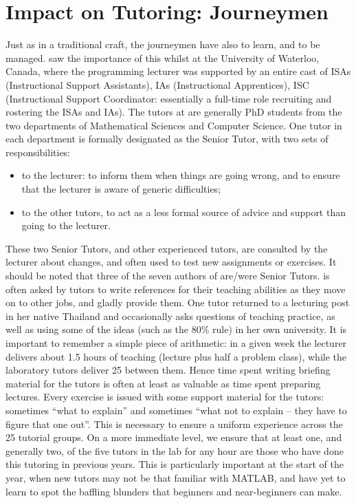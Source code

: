 \documentclass[conference,compsoc]{IEEEtran}
\begin{document}
\section{Impact on Tutoring: Journeymen}
Just as in a traditional craft, the journeymen have also to learn, and
to be managed. \JHD{} saw the importance of this whilst at the
University of Waterloo, Canada, where the programming lecturer was supported by an entire cast of ISAs (Instructional Support Assistants), IAs (Instructional Apprentices), ISC (Instructional Support Coordinator: essentially a full-time role recruiting and rostering the ISAs and IAs).
The tutors at \Bath{} are generally PhD students from the two departments of Mathematical Sciences and Computer Science. One tutor in each department is formally designated as the Senior Tutor, with two sets of responsibilities:
\begin{itemize}
\item	to the lecturer: to inform them when things are going wrong, and to ensure that the lecturer is aware of generic difficulties;
\item to the other tutors, to act as a less formal source of advice and support than going to the lecturer.
\end{itemize}
These two Senior Tutors, and other experienced tutors, are consulted by the lecturer about changes, and often used to test new assignments or exercises. It should be noted that three of the seven authors of \cite{XX} are/were Senior Tutors. \JHD{} is often asked by tutors to write references for their teaching abilities as they move on to other jobs, and gladly provide them. One tutor returned to a lecturing post in her native Thailand and occasionally asks \JHD{} questions of teaching practice, as well as using some of the ideas (such as the 80\% rule) in her own university.
It is important to remember a simple piece of arithmetic: in a given week the lecturer delivers about 1.5 hours of teaching (lecture plus half a problem class), while the laboratory tutors deliver 25 between them. Hence time spent writing briefing material for the tutors is often at least as valuable as time spent preparing lectures. Every exercise is issued with some support material for the tutors: sometimes ``what to explain'' and sometimes ``what not to explain -- they have to figure that one out''. This is necessary to ensure a uniform experience across the 25 tutorial groups.
On a more immediate level, we ensure that at least one, and generally two, of the five tutors in the lab for any hour are those who have done this tutoring in previous years. This is particularly important at the start of the year, when new tutors may not be that familiar with MATLAB, and have yet to learn to spot the baffling blunders that beginners and near-beginners can make.
\end{document}
